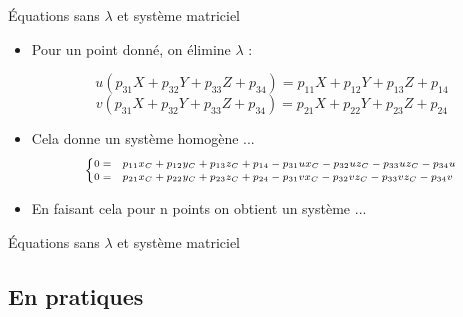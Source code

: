 
\begin{frame}{Équations sans \(\lambda\) et système matriciel}

\begin{itemize}
  \item<1-> Pour un point donné, on élimine \( \lambda \) :
  
  \[
  u (p_{31}X + p_{32}Y + p_{33}Z + p_{34}) = p_{11}X + p_{12}Y + p_{13}Z + p_{14}
  \]
  \[
  v (p_{31}X + p_{32}Y + p_{33}Z + p_{34}) = p_{21}X + p_{22}Y + p_{23}Z + p_{24}
  \]

  \vspace{0.5em}
   \item<2-> Cela donne un système homogène ...
   \[
   \scriptsize
   \begin{cases}
0= & p_{11} x_{C} +p_{12} y_{C}  +p_{13} z_{C} +p_{14} -p_{31} u x_{C} -p_{32} u  z_{C}  -p_{33} u  z_{C}  -p_{34} u \\
0= &  p_{21} x_{C}  +p_{22} y_{C}  +p_{23} z_{C}  +p_{24} -p_{31} v  x_{C}  -p_{32} v  z_{C}  -p_{33} v  z_{C}  -p_{34} v 
\end{cases}
   \]
  \item<3-> En faisant cela pour n points on obtient un système ...
\end{itemize}

\end{frame}


\begin{frame}{Équations sans \(\lambda\) et système matriciel}
  
\end{frame}

\subsection{En pratiques}


